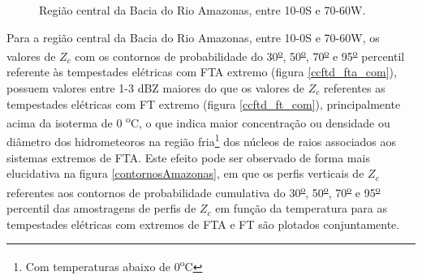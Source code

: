\begin{figure}[!ht]
  \centering
  \caption{Região central da Bacia do Rio Amazonas, entre 10-0S e 70-60W.}
  \label{deriv_amazonas}  
\end{figure} 

Para a região central da Bacia do Rio Amazonas, entre 10-0S e 70-60W, os valores de $Z_c$ com os contornos de probabilidade do 30\textsuperscript{\underline{o}}, 50\textsuperscript{\underline{o}}, 70\textsuperscript{\underline{o}} e 95\textsuperscript{\underline{o}} percentil referente às tempestades elétricas com FTA extremo (figura \ref{ccftd_fta_com}), possuem valores entre 1-3 dBZ maiores do que os valores de $Z_c$ referentes as tempestades elétricas com FT extremo (figura \ref{ccftd_ft_com}), principalmente acima da isoterma de 0 \textsuperscript{o}C, o que indica maior concentração ou densidade ou diâmetro dos hidrometeoros na região fria\footnote{Com temperaturas abaixo de  0\textsuperscript{o}C} dos núcleos de raios associados aos sistemas extremos de FTA. Este efeito pode ser observado de forma mais elucidativa na figura \ref{contornosAmazonas}, em que os perfis verticais de $Z_c$ referentes aos contornos de probabilidade cumulativa do 30\textsuperscript{\underline{o}}, 50\textsuperscript{\underline{o}}, 70\textsuperscript{\underline{o}} e 95\textsuperscript{\underline{o}} percentil das amostragens de perfis de $Z_c$ em função da temperatura  para as tempestades elétricas com extremos de FTA e FT são plotados conjuntamente.

